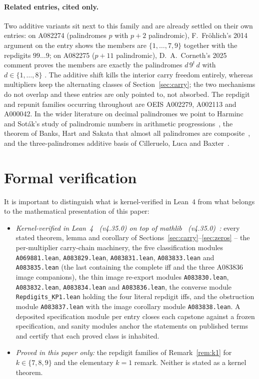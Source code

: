 \documentclass[12pt]{article}
\begin{document}
\paragraph{Related entries, cited only.}
Two additive variants sit next to this family and are
already settled on their own entries: on A082274
(palindromes $p$ with $p+2$ palindromic), F.~Fr\"ohlich's
2014 argument on the entry shows the members are
$\{1,\dots,7,9\}$ together with the repdigits
$99\ldots9$; on A082275 ($p+11$ palindromic), D.~A.~Corneth's
2025 comment proves the members are exactly the
palindromes $d\,9^{t}\,d$ with $d \in \{1,\dots,8\}$
\cite{a082274,a082275}. The additive shift kills the
interior carry freedom entirely, whereas multipliers keep
the alternating classes of Section~\ref{sec:carry}; the
two mechanisms do not overlap and these entries are only
pointed to, not absorbed. The repdigit and repunit
families occurring throughout are OEIS A002279, A002113
and A000042. In the wider literature on decimal
palindromes we point to Harminc and Sot\'ak's study of
palindromic numbers in arithmetic
progressions~\cite{harmincsotak}, the theorem of Banks,
Hart and Sakata that almost all palindromes are
composite~\cite{banks}, and the three-palindromes
additive basis of Cilleruelo, Luca and
Baxter~\cite{cll}.









\section{Formal verification}
\label{sec:lean}

It is important to distinguish what is kernel-verified in
Lean~4 from what belongs to the mathematical presentation
of this paper:
\begin{itemize}
\item \emph{Kernel-verified in Lean~4~\cite{lean4}
(v4.35.0) on top of mathlib~\cite{mathlib}
(v4.35.0)~\cite{artifacts}:} every stated theorem, lemma
and corollary of Sections~\ref{sec:carry}--\ref{sec:zeros}
-- the per-multiplier carry-chain machinery, the five
classification modules \texttt{A069881.lean},
\texttt{A083829.lean}, \texttt{A083831.lean},
\texttt{A083833.lean} and \texttt{A083835.lean} (the
last containing the complete iff and the three A083836
image companions), the thin image re-export modules
\texttt{A083830.lean}, \texttt{A083832.lean},
\texttt{A083834.lean} and \texttt{A083836.lean}, the
converse module \texttt{Repdigits\_KP1.lean} holding the
four literal repdigit iffs, and the obstruction module
\texttt{A083837.lean} with the image corollary module
\texttt{A083838.lean}. A deposited specification module
per entry closes each capstone against a frozen
specification, and sanity modules anchor the
statements on published terms and certify that each
proved class is inhabited.
\item \emph{Proved in this paper only:} the repdigit
families of Remark~\ref{rem:k1} for $k \in \{7,8,9\}$
and the elementary $k = 1$ remark. Neither is stated as
a kernel theorem.
\end{itemize}
\end{document}
